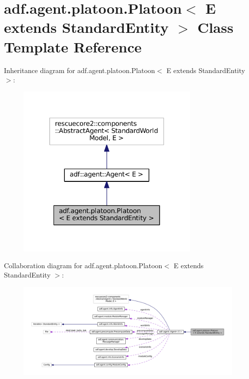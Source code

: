 \hypertarget{classadf_1_1agent_1_1platoon_1_1Platoon}{}\section{adf.\+agent.\+platoon.\+Platoon$<$ E extends Standard\+Entity $>$ Class Template Reference}
\label{classadf_1_1agent_1_1platoon_1_1Platoon}


Inheritance diagram for adf.\+agent.\+platoon.\+Platoon$<$ E extends Standard\+Entity $>$\+:
\nopagebreak
\begin{figure}[H]
\begin{center}
\leavevmode
\includegraphics[width=254pt]{classadf_1_1agent_1_1platoon_1_1Platoon__inherit__graph}
\end{center}
\end{figure}


Collaboration diagram for adf.\+agent.\+platoon.\+Platoon$<$ E extends Standard\+Entity $>$\+:
\nopagebreak
\begin{figure}[H]
\begin{center}
\leavevmode
\includegraphics[width=350pt]{classadf_1_1agent_1_1platoon_1_1Platoon__coll__graph}
\end{center}
\end{figure}
